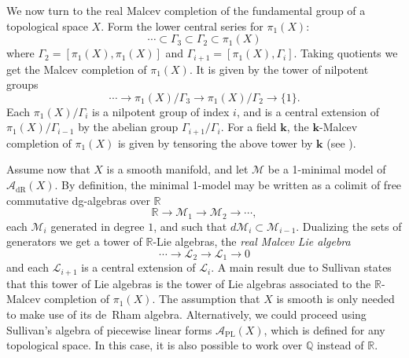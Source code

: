 \documentclass[a4paper]{amsart}
\theoremstyle{definition}
\newcommand{\RR}{\mathbb{R}}
\newcommand{\Ll}{\mathcal{L}}
\newcommand{\Mm}{\mathcal{M}}
\newcommand{\kk}{\mathbf{k}}
\begin{document}
We now turn to the real Malcev completion of the fundamental group of a topological space $X$.
Form the lower central series for $\pi_1(X)$:
\[\cdots\subset \Gamma_3\subset \Gamma_2\subset\pi_1(X)\]
where $\Gamma_2=[\pi_1(X),\pi_1(X)]$ and $\Gamma_{i+1}=[\pi_1(X),\Gamma_i]$. Taking quotients we get the Malcev completion of $\pi_1(X)$. It is given by the tower of nilpotent groups
\[\cdots\to \pi_1(X)/\Gamma_3\to\pi_1(X)/\Gamma_2\to \{1\}.\]
Each $\pi_1(X)/\Gamma_i$ is a nilpotent group of index $i$, and is a central extension of $\pi_1(X)/\Gamma_{i-1}$ by the abelian group $\Gamma_{i+1}/\Gamma_i$. For a field $\kk$, the $\kk$-Malcev completion of $\pi_1(X)$ is given by tensoring the above tower by $\kk$
(see \cite{Sullivan}).

Assume now that $X$ is a smooth manifold, and let $\mathcal{M}$ be a 1-minimal model of $\mathcal{A}_{\mathrm{dR}}(X)$.
By definition, the minimal 1-model may be written as a colimit of free commutative dg-algebras over $\RR$
\[\RR\to \Mm_1\to \Mm_2\to\cdots,\]
each $\Mm_i$ generated in degree $1$, and such that $d\Mm_i\subset \Mm_{i-1}$.
Dualizing the sets of generators we get a tower of $\RR$-Lie algebras, the \textit{real Malcev Lie algebra}
\[\cdots\to \Ll_2\to\Ll_1\to 0\]
and each $\Ll_{i+1}$ is a central extension of $\Ll_i$. A main result due to Sullivan \cite{Sullivan} states that this tower of Lie algebras is the tower of Lie algebras associated to the $\RR$-Malcev completion of $\pi_1(X)$.
The assumption that $X$ is smooth is only needed to make use of its de~Rham algebra. Alternatively, we could proceed using Sullivan's algebra of piecewise linear forms $\mathcal{A}_{\mathrm{PL}}(X)$, which is defined for any topological space. In this case, it is also possible to work over $\mathbb{Q}$ instead of $\mathbb{R}$.
\end{document}
